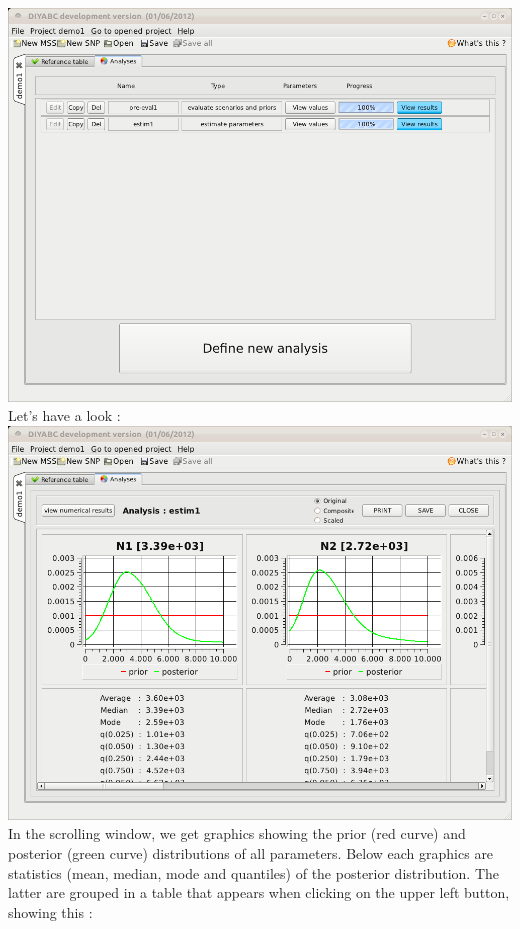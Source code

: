 \includegraphics[scale=0.35]{gui_pictures/Capture-DIYABC-39.png} \\

Let's have a look :\\

\includegraphics[scale=0.35]{gui_pictures/Capture-DIYABC-40.png} \\

In the scrolling window, we get graphics showing the prior (red curve) and posterior (green curve) distributions of all parameters. Below each graphics are statistics (mean, median, mode and quantiles) of the posterior distribution. The latter are grouped in a table that appears when clicking on the upper left  button, showing this :\\

